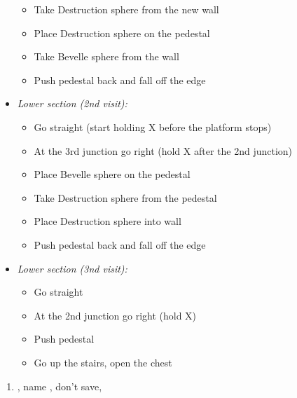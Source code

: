 \begin{trial}
\begin{itemize}
\begin{itemize}
            \item Take Destruction sphere from the new wall
            \item Place Destruction sphere on the pedestal
            \item Take Bevelle sphere from the wall
            \item Push pedestal back and fall off the edge
        \end{itemize}
        \item \textit{Lower section (2nd visit):}
        \begin{itemize}
            \item Go straight (start holding X before the platform stops)
            \item At the 3rd junction go right (hold X after the 2nd junction)
            \item Place Bevelle sphere on the pedestal
            \item Take Destruction sphere from the pedestal
            \item Place Destruction sphere into wall
            \item Push pedestal back and fall off the edge
        \end{itemize}
        \item \textit{Lower section (3nd visit):}
        \begin{itemize}
            \item Go straight
            \item At the 2nd junction go right (hold X)
            \item Push pedestal
            \item Go up the stairs, open the chest
        \end{itemize}
    \end{itemize}
\end{trial}
\begin{enumerate}[resume]
    \item \sd, name \bahamut, don't save, \sd
\end{enumerate}
\lossvfill
\ 
\losscb
\ \lossnewline \ 
